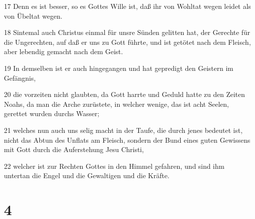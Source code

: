 \par 17 Denn es ist besser, so es Gottes Wille ist, daß ihr von Wohltat wegen leidet als von Übeltat wegen.
\par 18 Sintemal auch Christus einmal für unsre Sünden gelitten hat, der Gerechte für die Ungerechten, auf daß er uns zu Gott führte, und ist getötet nach dem Fleisch, aber lebendig gemacht nach dem Geist.
\par 19 In demselben ist er auch hingegangen und hat gepredigt den Geistern im Gefängnis,
\par 20 die vorzeiten nicht glaubten, da Gott harrte und Geduld hatte zu den Zeiten Noahs, da man die Arche zurüstete, in welcher wenige, das ist acht Seelen, gerettet wurden durchs Wasser;
\par 21 welches nun auch uns selig macht in der Taufe, die durch jenes bedeutet ist, nicht das Abtun des Unflats am Fleisch, sondern der Bund eines guten Gewissens mit Gott durch die Auferstehung Jesu Christi,
\par 22 welcher ist zur Rechten Gottes in den Himmel gefahren, und sind ihm untertan die Engel und die Gewaltigen und die Kräfte.

\chapter{4}

